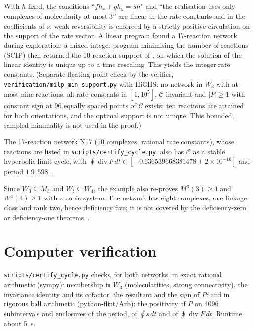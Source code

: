\documentclass[11pt,a4paper]{report}
\begin{document}
\begin{remark}[note=construction]
With \(h\) fixed, the conditions ``\(fh_x+gh_y=sh\)'' and ``the realisation uses only complexes of molecularity at most
3'' are linear in the rate constants and in the coefficients of \(s\); weak reversibility is enforced by a strictly
positive circulation on the support of the rate vector. A linear program found a 17-reaction network during
exploration; a mixed-integer program minimising the number of reactions (SCIP) then returned the 10-reaction support
of , on which the solution of the linear identity is unique up to a time rescaling. This yields the
integer rate constants. (Separate floating-point check by the verifier, \texttt{verification/milp\_min\_support.py}
with HiGHS: no network in \(W_3\) with at most nine reactions, all rate constants in \([1,10^5]\), \(\mathcal C\)
invariant and \(|P|\ge1\) with constant sign at 96 equally spaced points of \(\mathcal C\) exists; ten reactions are
attained for both orientations, and the optimal support is not unique. This bounded, sampled minimality is not used in
the proof.)
\end{remark}

\begin{remark}[note=a second example]
The 17-reaction network N17 (10 complexes, rational rate constants), whose reactions are listed in
\texttt{scripts/certify\_cycle.py}, also has \(\mathcal C\) as a stable hyperbolic limit cycle, with
\(\oint\operatorname{div}F\,dt\in[-0.636539668381478\pm2\times10^{-16}]\) and period \(1.91598\ldots\)
\end{remark}

\begin{remark}
Since \(W_3\subseteq M_3\) and \(W_3\subseteq W_4\), the example also re-proves \(M^a(3)\ge1\) and \(W^a(4)\ge1\) with a
cubic system. The network has eight complexes, one linkage class and rank two, hence deficiency five; it is not
covered by the deficiency-zero or deficiency-one theorems~\autocite{Feinberg2019}.
\end{remark}

\section{Computer verification}

\texttt{scripts/certify\_cycle.py} checks, for both networks, in exact rational arithmetic (sympy): membership in
\(W_3\) (molecularities, strong connectivity), the invariance identity and its cofactor, the resultant and the sign of
\(P\); and in rigorous ball arithmetic (python-flint/Arb): the positivity of \(P\) on 4096 subintervals and enclosures
of the period, of \(\oint s\,dt\) and of \(\oint\operatorname{div}F\,dt\). Runtime about 5~s.
\end{document}

